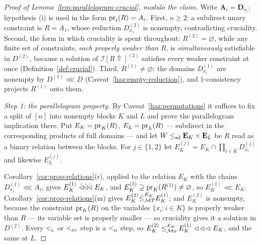 \begin{proof}[Proof of Lemma~\ref{lem:parallelogram-crucial}, modulo the claim]
Write $\mathbf A_{i}=\mathbf D_{x_{i}}$; hypothesis (i) is used in the form
$\proj_{i}(R)=A_{i}$. First, $n\ge2$: a subdirect unary constraint is
$R=A_{1}$, whose reduction $D^{(2)}_{x_{1}}$ is nonempty, contradicting
cruciality. Second, the form in which cruciality is spent throughout: $R^{(2)}
=\varnothing$, while any finite set of constraints, \emph{each properly weaker
than $R$}, is \emph{simultaneously} satisfiable in $D^{(2)}$, because a
solution of $\mathcal I[R\Uparrow]^{(2)}$ satisfies every weaker constraint at
once (Definition~\ref{def:crucial}). Third, $R^{(1)}\neq\varnothing$: the
domains $D^{(1)}_{x_{i}}$ are nonempty by $D^{(1)}\lll D$
(Caveat~\ref{haz:empty-reduction}), and $1$-consistency projects $R^{(1)}$
onto them.

\emph{Step 1: the parallelogram property.} By
Caveat~\ref{haz:permutations} it suffices to fix a split of $[n]$ into
nonempty blocks $K$ and $L$ and prove the parallelogram implication there. Put
$E_{K}=\proj_{K}(R)$, $E_{L}=\proj_{L}(R)$ --- subdirect in the corresponding
products of full domains --- and let $W\sdle\mathbf E_{K}\times\mathbf E_{L}$
be $R$ read as a binary relation between the blocks. For $j\in\{1,2\}$ let
$E_{K}^{(j)}=E_{K}\cap\prod_{i\in K}D^{(j)}_{x_{i}}$ and likewise
$E_{L}^{(j)}$.

Corollary~\ref{cor:prop-relations}(r), applied to the relation $E_{K}$ with
the chains $D^{(1)}_{x_{i}}\lll A_{i}$, gives $E_{K}^{(1)}\dlll E_{K}$, and
$E_{K}^{(1)}\supseteq\proj_{K}(R^{(1)})\neq\varnothing$, so
$E_{K}^{(1)}\lll E_{K}$. Corollary~\ref{cor:prop-relations}(m) gives
$E_{K}^{(2)}\dsubte[E_{K}]{\MT T}E_{K}^{(1)}$; and $E_{K}^{(2)}$ is nonempty,
because the constraint $\proj_{K}(R)$ on the variables $\{x_{i}:i\in K\}$ is
properly weaker than $R$ --- its variable set is properly smaller --- so
cruciality gives it a solution in $D^{(2)}$. Every $\subt{\TL}$ or
$\subt{\TPC}$ step is a $\subt{\TD}$ step, so
$E_{K}^{(2)}\subte[E_{K}]{\TMD}E_{K}^{(1)}\lll E_{K}$, and the same at $L$.


\end{proof}
